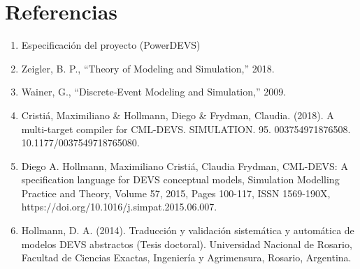 \documentclass[12pt]{article}
\begin{document}
\section{Referencias}
\begin{enumerate}
    \item Especificación del proyecto (PowerDEVS)
    \item Zeigler, B. P., “Theory of Modeling and Simulation,” 2018.
    \item Wainer, G., “Discrete‐Event Modeling and Simulation,” 2009.
    \item Cristiá, Maximiliano \& Hollmann, Diego \& Frydman, Claudia. (2018). A multi-target compiler for CML-DEVS. SIMULATION. 95. 003754971876508. 10.1177/0037549718765080. 
    \item Diego A. Hollmann, Maximiliano Cristiá, Claudia Frydman, CML-DEVS: A specification language for DEVS conceptual models, Simulation Modelling Practice and Theory, Volume 57, 2015, Pages 100-117, ISSN 1569-190X, \\ https://doi.org/10.1016/j.simpat.2015.06.007.
    \item Hollmann, D. A. (2014). Traducción y validación sistemática y automática de modelos DEVS abstractos (Tesis doctoral). Universidad Nacional de Rosario, Facultad de Ciencias Exactas, Ingeniería y Agrimensura, Rosario, Argentina.
\end{enumerate}
\end{document}
